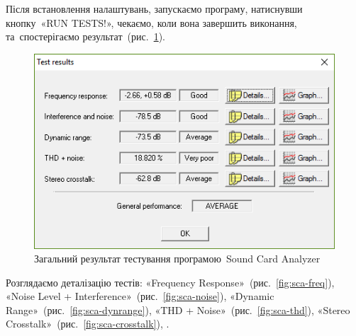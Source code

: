 \documentclass[
	a4paper,
	oneside,
	BCOR = 10mm,
	DIV = 12,
	12pt,
	headings = normal,
]{scrartcl}
\begin{document}
			Після встановлення налаштувань, запускаємо програму, натиснувши кнопку~«\textenglish{RUN TESTS!}», чекаємо, коли вона завершить виконання, та~спостерігаємо результат~(рис.~\ref{fig:sca-test}).

			\begin{figure}[!htbp]
				\centering
				\includegraphics[height=8\baselineskip]{./assets/y03s02-pcdiag-lab-07-p01-01-test-res.png}
				\caption{Загальний результат тестування програмою~\textenglish{Sound Card Analyzer}}
				\label{fig:sca-test}
			\end{figure}

			Розглядаємо деталізацію тестів: «\textenglish{Frequency Response}»~(рис.~\ref{fig:sca-freq}), «\textenglish{Noise Level + Interference}»~(рис.~\ref{fig:sca-noise}), «\textenglish{Dynamic Range}»~(рис.~\ref{fig:sca-dynrange}), «\textenglish{THD + Noise}»~(рис.~\ref{fig:sca-thd}), «\textenglish{Stereo Crosstalk}»~(рис.~\ref{fig:sca-crosstalk}), .
\end{document}
